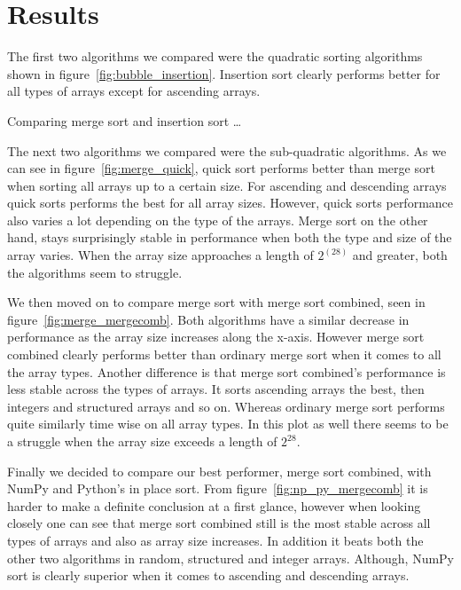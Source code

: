 \documentclass[sigconf, nonacm, natbib, screen, balance=False]{acmart}
\begin{document}
\section{Results}\label{sec:results}

The first two algorithms we compared were the quadratic sorting algorithms shown in figure~\ref{fig:bubble_insertion}. Insertion sort clearly performs better for all types of arrays except for ascending arrays. \newline

Comparing merge sort and insertion sort \dots

The next two algorithms we compared were the sub-quadratic algorithms. As we can see in figure~\ref{fig:merge_quick}, quick sort performs better than merge sort when sorting all arrays up to a certain size. For ascending and descending arrays quick sorts performs the best for all array sizes. However, quick sorts performance also varies a lot depending on the type of the arrays. Merge sort on the other hand, stays surprisingly stable in performance when both the type and size of the array varies. When the array size approaches a length of $2^(28)$ and greater, both the algorithms seem to struggle. \newline

We then moved on to compare merge sort with merge sort combined, seen in figure~\ref{fig:merge_mergecomb}. Both algorithms have a similar decrease in performance as the array size increases along the x-axis. However merge sort combined clearly performs better than ordinary merge sort when it comes to all the array types. Another difference is that merge sort combined's performance is less stable across the types of arrays. It sorts ascending arrays the best, then integers and structured arrays and so on. Whereas ordinary merge sort performs quite similarly time wise on all array types. In this plot as well there seems to be a struggle when the array size exceeds a length of $2^{28}$. \newline

Finally we decided to compare our best performer, merge sort combined, with NumPy and Python's in place sort. From figure~\ref{fig:np_py_mergecomb} it is harder to make a definite conclusion at a first glance, however when looking closely one can see that merge sort combined still is the most stable across all types of arrays and also as array size increases. In addition it beats both the other two algorithms in random, structured and integer arrays. Although, NumPy sort is clearly superior when it comes to ascending and descending arrays. \newline
\end{document}
